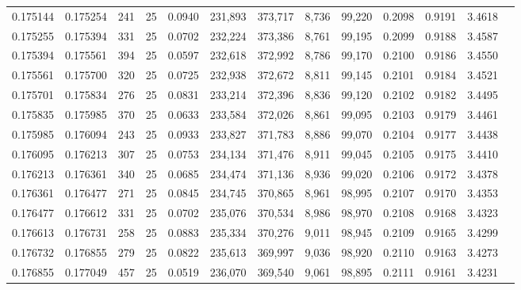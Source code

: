 \begin{tabular}{rrrrrrrrrrrrr}
0.175144 & 0.175254 &   241 &  25 &                                     0.0940 & 231,893 & 373,717 &   8,736 &  99,220 & 0.2098 & 0.9191 & 3.4618 \\
0.175255 & 0.175394 &   331 &  25 &                                     0.0702 & 232,224 & 373,386 &   8,761 &  99,195 & 0.2099 & 0.9188 & 3.4587 \\
0.175394 & 0.175561 &   394 &  25 &                                     0.0597 & 232,618 & 372,992 &   8,786 &  99,170 & 0.2100 & 0.9186 & 3.4550 \\
0.175561 & 0.175700 &   320 &  25 &                                     0.0725 & 232,938 & 372,672 &   8,811 &  99,145 & 0.2101 & 0.9184 & 3.4521 \\
0.175701 & 0.175834 &   276 &  25 &                                     0.0831 & 233,214 & 372,396 &   8,836 &  99,120 & 0.2102 & 0.9182 & 3.4495 \\
0.175835 & 0.175985 &   370 &  25 &                                     0.0633 & 233,584 & 372,026 &   8,861 &  99,095 & 0.2103 & 0.9179 & 3.4461 \\
0.175985 & 0.176094 &   243 &  25 &                                     0.0933 & 233,827 & 371,783 &   8,886 &  99,070 & 0.2104 & 0.9177 & 3.4438 \\
0.176095 & 0.176213 &   307 &  25 &                                     0.0753 & 234,134 & 371,476 &   8,911 &  99,045 & 0.2105 & 0.9175 & 3.4410 \\
0.176213 & 0.176361 &   340 &  25 &                                     0.0685 & 234,474 & 371,136 &   8,936 &  99,020 & 0.2106 & 0.9172 & 3.4378 \\
0.176361 & 0.176477 &   271 &  25 &                                     0.0845 & 234,745 & 370,865 &   8,961 &  98,995 & 0.2107 & 0.9170 & 3.4353 \\
0.176477 & 0.176612 &   331 &  25 &                                     0.0702 & 235,076 & 370,534 &   8,986 &  98,970 & 0.2108 & 0.9168 & 3.4323 \\
0.176613 & 0.176731 &   258 &  25 &                                     0.0883 & 235,334 & 370,276 &   9,011 &  98,945 & 0.2109 & 0.9165 & 3.4299 \\
0.176732 & 0.176855 &   279 &  25 &                                     0.0822 & 235,613 & 369,997 &   9,036 &  98,920 & 0.2110 & 0.9163 & 3.4273 \\
0.176855 & 0.177049 &   457 &  25 &                                     0.0519 & 236,070 & 369,540 &   9,061 &  98,895 & 0.2111 & 0.9161 & 3.4231 \\

\end{tabular}
